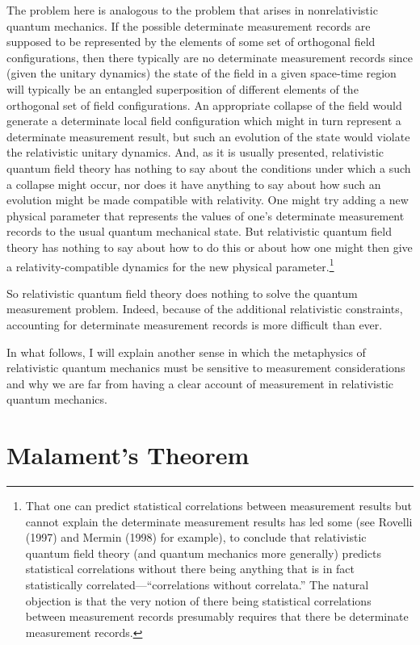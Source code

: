 \documentclass [12pt]{article}
\begin{document}
The problem here is analogous to the problem that arises in nonrelativistic quantum
mechanics.  If the possible determinate measurement records are supposed to be 
represented by the elements of some set of orthogonal field configurations,
then there typically are no determinate measurement records since (given the 
unitary dynamics) the state of the field in a given space-time region
will typically be an entangled superposition of different elements of
the orthogonal set of field configurations.  An appropriate
collapse of the field would generate a determinate local field configuration
which might in turn represent a determinate measurement result, but such an evolution
of the state would violate the relativistic unitary dynamics.  And, as it is usually
presented, relativistic quantum field theory has nothing to say about the conditions under which a such a
collapse might occur, nor does it have
anything to say about how such an evolution might be made compatible with relativity.  One
might try adding a new physical parameter that 
represents the values of one's determinate measurement records
to the usual quantum mechanical state.  But relativistic quantum field theory has nothing to 
say about how to do this or about how one might then give a relativity-compatible
dynamics for the new physical parameter.\footnote{That one can predict statistical
correlations between measurement results but cannot explain the determinate measurement
results has led some (see Rovelli (1997) and Mermin (1998) for example), to conclude that relativistic quantum
field theory (and quantum mechanics more generally) predicts statistical correlations without there being
anything that is in fact statistically correlated---``correlations without
correlata.''  The natural objection is that the very notion of there being
statistical correlations between measurement records presumably requires that
there be determinate measurement records.}

So relativistic quantum field theory does nothing to solve the quantum
measurement problem.  Indeed, because of the additional relativistic
constraints, accounting for determinate measurement records is
more difficult than ever.

In what follows, I will explain another sense in which the metaphysics
of relativistic quantum mechanics must be sensitive to measurement considerations
and why we are far from having a clear account of measurement in
relativistic quantum mechanics.


\section{Malament's Theorem}
\end{document}
